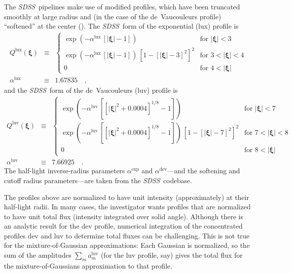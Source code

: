 \documentclass[12pt,pdftex,preprint]{aastex}
\newcommand{\project}[1]{\textsl{#1}}
\newcommand{\sdss}{\project{SDSS}}
\newcommand{\tvector}[1]{\boldsymbol{#1}}
\newcommand{\spos}{\tvector{\xi}}
\newcommand{\dev}{\mathrm{dev}}
\newcommand{\lux}{\mathrm{lux}}
\newcommand{\luv}{\mathrm{luv}}
\begin{document}
The \sdss\ pipelines make use of modified profiles, which have been
truncated smoothly at large radius and (in the case of the
de~Vaucouleurs profile) ``softened'' at the center (\citealt{lupton}).
The \sdss\ form of the exponential (lux) profile is
\begin{eqnarray}\displaystyle
Q^{\lux}(\spos) &\equiv& \left\{\begin{array}{ll}
  \exp(-\alpha^{\lux}\,[|\spos| - 1]) & \mbox{for~}|\spos| < 3 \\
  \exp(-\alpha^{\lux}\,[|\spos| - 1])
  \,\left[1 - [|\spos| - 3]^2\right]^2 & \mbox{for~}3 < |\spos| < 4 \\
  0                                   & \mbox{for~}4 < |\spos|
\end{array}\right.
\\
\alpha^{\lux} &\equiv& 1.67835
\quad ,
\end{eqnarray}
and the \sdss\ form of the de~Vaucouleurs (luv) profile is
\begin{eqnarray}\displaystyle
Q^{\luv}(\spos) &\equiv& \left\{\begin{array}{ll}
  \exp(-\alpha^{\luv}\,\left[[|\spos|^2 + 0.0004]^{1/8} - 1\right]) & \mbox{for~}|\spos| < 7 \\
  \exp(-\alpha^{\luv}\,\left[[|\spos|^2 + 0.0004]^{1/8} - 1\right])
  \,\left[1 - [|\spos| - 7]^2\right]^2 & \mbox{for~}7 < |\spos| < 8 \\
  0                                   & \mbox{for~}8 < |\spos|
\end{array}\right.
\\
\alpha^{\luv} &\equiv& 7.66925
\quad .
\end{eqnarray}
The half-light inverse-radius parameters $\alpha^{\exp}$ and
$\alpha^{\dev}$---and the softening and cutoff radius parameters---are
taken from the \sdss\ codebase.

The profiles above are normalized to have unit intensity
(approximately) at their half-light radii.  In many cases, the
investigator wants profiles that are normalized to have unit total
flux (intensity integrated over solid angle).  Although there is an
analytic result for the dev profile, numerical integration of the
concentrated profiles dev and luv to determine total fluxes can be
challenging.  This is not true for the mixture-of-Gaussian
approximations: Each Gaussian is normalized, so the sum of the
amplitudes $\sum_m a^{\luv}_m$ (for the luv profile, say) gives the
total flux for the mixture-of-Gaussians approximation to that profile.
\end{document}
